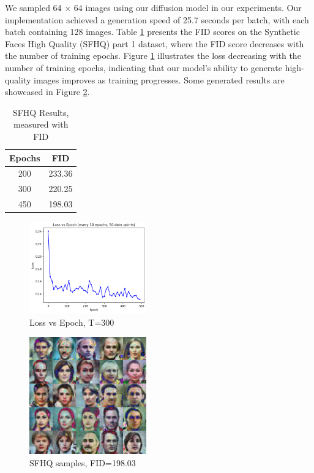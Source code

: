 \documentclass[letterpaper]{article} %
\begin{document}
We sampled 64 $\times$ 64 images using our diffusion model in our experiments. Our implementation achieved a generation speed of 25.7 seconds per batch, with each batch containing 128 images. Table \ref{tab:FID} presents the FID scores on the Synthetic Faces High Quality (SFHQ) part 1 dataset, where the FID score decreases with the number of training epochs. Figure \ref{fig:figure7} illustrates the loss decreasing with the number of training epochs, indicating that our model's ability to generate high-quality images improves as training progresses. Some generated results are showcased in Figure \ref{fig:high}.

\begin{table}[t]
\centering
\begin{tabular}{c|c}
\textbf{Epochs} & \textbf{FID} \\
\hline
        200  & 233.36 \\
        300  & 220.25 \\
        450 & 198.03
\end{tabular}
\caption{SFHQ Results, measured with FID}
\label{tab:FID}
\end{table}

\begin{figure}[htbp]
    \centering
    \includegraphics[width=0.45\textwidth]{f6.png} %
    \caption{Loss vs Epoch, T=300}
    \label{fig:figure7}
\end{figure}

\begin{figure}[htbp]
    \centering
    \includegraphics[width=0.45\textwidth]{f7.jpg}
    \caption{SFHQ samples, FID=198.03}
    \label{fig:high}
\end{figure}
\end{document}
